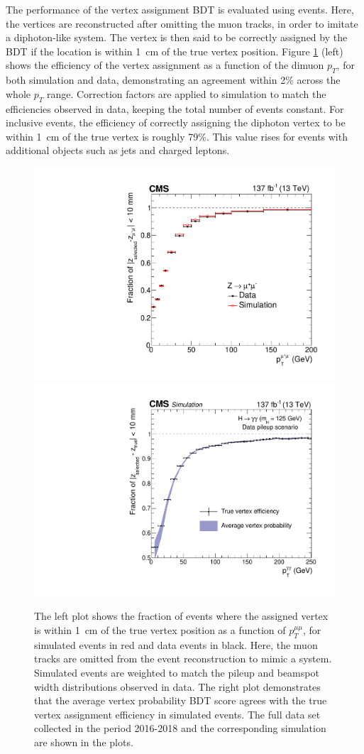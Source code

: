 The performance of the vertex assignment BDT is evaluated using \Zmumu events. Here, the vertices are reconstructed after omitting the muon tracks, in order to imitate a diphoton-like system. The vertex is then said to be correctly assigned by the BDT if the location is within 1~cm of the true vertex position. Figure \ref{fig:vertex_selection_0} (left) shows the efficiency of the vertex assignment as a function of the dimuon $p_T$, for both simulation and data, demonstrating an agreement within 2\% across the whole $p_T$ range. Correction factors are applied to simulation to match the efficiencies observed in data, keeping the total number of events constant. For inclusive \Hgg events, the efficiency of correctly assigning the diphoton vertex to be within 1~cm of the true vertex is roughly 79\%. This value rises for events with additional objects such as jets and charged leptons.

\begin{figure}[htb!]
  \centering
  \includegraphics[width=.49\textwidth]{Figures/hgg_overview/Zmumu_eff_vs_pt_All.pdf}
  \includegraphics[width=.49\textwidth]{Figures/hgg_overview/AverageProbPlotFullRunIIVersusPt.pdf}
  \caption[Vertex-assignment and vertex-probability BDT]
  {
    The left plot shows the fraction of \Zmumu events where the assigned vertex is within 1~cm of the true vertex position as a function of $p_T^{\mu\mu}$, for simulated events in red and data events in black. Here, the muon tracks are omitted from the event reconstruction to mimic a \Hgg system. Simulated events are weighted to match the pileup and beamspot width distributions observed in data. The right plot demonstrates that the average vertex probability BDT score agrees with the true vertex assignment efficiency in simulated events. The full data set collected in the period 2016-2018 and the corresponding simulation are shown in the plots.
  }
  \label{fig:vertex_selection_0}
\end{figure}

